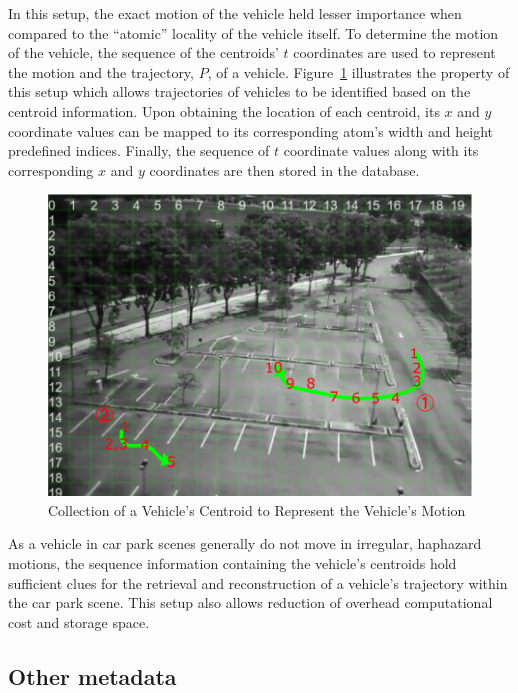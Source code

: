 In this setup, the exact motion of the vehicle held lesser importance when compared to the ``atomic'' locality of the vehicle itself.
To determine the motion of the vehicle, the sequence of the centroids' $t$ coordinates are used to represent the motion and the trajectory, $P$, of a vehicle. Figure~\ref{fig:motionExample} illustrates the property of this setup which allows trajectories of vehicles to be identified based on the centroid information. Upon obtaining the location of each centroid, its $x$ and $y$ coordinate values can be mapped to its corresponding atom's width and height predefined indices. Finally, the sequence of $t$ coordinate values along with its corresponding $x$ and $y$ coordinates are then stored in the database.
\begin{figure}[hbt!]\centering
\includegraphics[width=.9\textwidth]{image/general/trajectorysample2.png}
\caption{Collection of a Vehicle's Centroid to Represent the Vehicle's Motion}
\label{fig:motionExample}
\end{figure}

As a vehicle in car park scenes generally do not move in irregular, haphazard motions, the sequence information containing the vehicle's centroids hold sufficient clues for the retrieval and reconstruction of a vehicle's trajectory within the car park scene. This setup also allows reduction of overhead computational cost and storage space. %


\vspace{1em}
\subsection{Other metadata}

